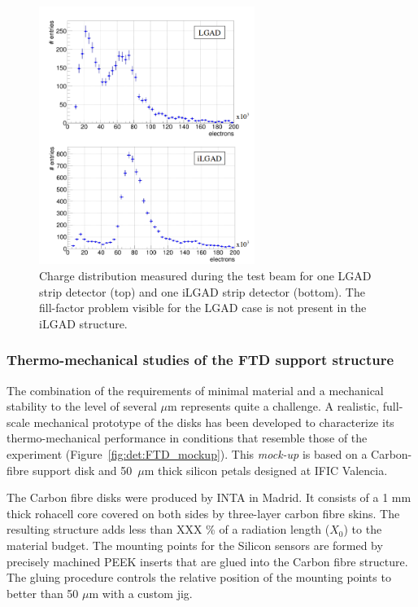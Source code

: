 \begin{figure}[t]
\centering
\includegraphics[width=7cm]{Detector/fig/fill-factor.png}
\caption{Charge distribution measured during the test beam for one LGAD strip detector (top) and one iLGAD strip detector (bottom). The fill-factor problem visible for the LGAD case is not present in the iLGAD structure.} 
\label{fig:det:fill-factor}
\centering
\end{figure}


\subsubsection{Thermo-mechanical studies of the FTD support structure}

The combination of the requirements of minimal material and a mechanical stability to 
the level of several $\mu\mathrm{m}$ represents quite a challenge. A realistic, 
full-scale mechanical prototype of the disks has been developed to characterize 
its thermo-mechanical performance 
in conditions that resemble those of the experiment (Figure~\ref{fig:det:FTD_mockup}). 
This {\em mock-up} is based on a Carbon-fibre support disk
and 50~$\mu\mathrm{m}$ thick silicon petals designed at IFIC Valencia. 

The Carbon fibre disks were produced by INTA in Madrid. It consists of
a 1 mm thick rohacell core covered on both sides by three-layer carbon fibre skins. The 
resulting structure adds less than XXX \% of a radiation length ($X_0$) to the material 
budget. The mounting points for the Silicon sensors are formed by precisely machined 
PEEK inserts that are glued into the Carbon fibre structure. The gluing procedure controls
the relative position of the mounting points to better than 50 $\mu \mathrm{m}$ with
a custom jig. 

